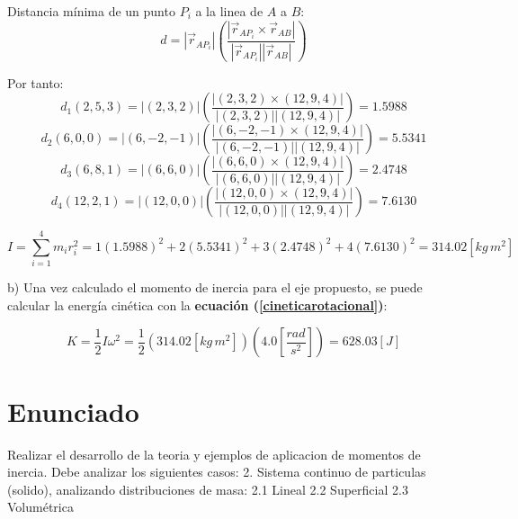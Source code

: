\documentclass[letter,11pt]{article}
\begin{document}
\begin{minipage}[b]{.9\linewidth}
Distancia mínima de un punto $P_i$ a la linea de $A$ a $B$:
\begin{equation*}
    d = | \vec{r}_{AP_i} | \left(\frac{| \vec{r}_{AP_i} \times \vec{r}_{AB} |}{|\vec{r}_{AP_i}| |\vec{r}_{AB}|} \right)
\end{equation*}

Por tanto:
\begin{equation*}
    d_1(2,5,3) = |(2,3,2)| \left(\frac{|(2,3,2)\times(12,9,4)|}{|(2,3,2)||(12,9,4)|}\right) = 1.5988
\end{equation*}
\begin{equation*}
    d_2(6,0,0) = |(6,-2,-1)| \left(\frac{|(6,-2,-1)\times(12,9,4)|}{|(6,-2,-1)||(12,9,4)|}\right) = 5.5341
\end{equation*}
\begin{equation*} 
    d_3(6,8,1) = |(6,6,0)| \left(\frac{|(6,6,0)\times(12,9,4)|}{|(6,6,0)||(12,9,4)|}\right) = 2.4748
\end{equation*}
\begin{equation*}
    d_4(12,2,1) = |(12,0,0)| \left(\frac{|(12,0,0)\times(12,9,4)|}{|(12,0,0)||(12,9,4)|}\right) = 7.6130
\end{equation*}

\begin{equation*}
    I = \sum_{i=1}^{4} m_i r^2_i = 1 (1.5988)^2 + 2 (5.5341)^2 + 3 (2.4748)^2 + 4 (7.6130)^2 = 314.02 [kg\, m^2]
\end{equation*}

b) Una vez calculado el momento de inercia para el eje propuesto, se puede
calcular la energía cinética con la \textbf{ecuación
(\ref{cineticarotacional})}:

\begin{equation*}
    K = \frac{1}{2} I \omega^2 =  \frac{1}{2} (314.02 [kg\, m^2]) \left(4.0 \left[\frac{rad}{s^2}\right]\right) = 628.03 [J]
\end{equation*}
\end{minipage}


\section{Enunciado}





Realizar el desarrollo de la teoria y ejemplos de aplicacion de
momentos de inercia. Debe analizar los siguientes casos:
2. Sistema continuo de particulas (solido), analizando distribuciones de masa:
2.1 Lineal
2.2 Superficial
2.3 Volumétrica
\end{document}
